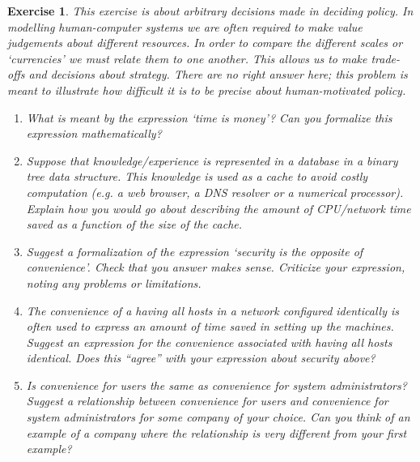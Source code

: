 \documentclass{book}
\newtheorem{exercise}{Exercise}
\begin{document}
\begin{exercise} 
This exercise is about arbitrary decisions made in deciding policy.
In modelling human-computer systems we are often required to make
value judgements about different resources. In order to compare the
different scales or `currencies' we must relate them to one another. This allows
us to make trade-offs and decisions about strategy. There are no right
answer here; this problem is meant to illustrate how difficult it is
to be precise about human-motivated policy.
\begin{enumerate}

\item What is meant by the expression `time is money'? Can you formalize this expression mathematically?
\item Suppose that knowledge/experience is represented in a database in  a binary tree data structure. This
knowledge is used as a cache to avoid costly computation (e.g. a web browser, a DNS resolver or a numerical
processor). Explain how you would go about describing the amount of CPU/network time saved as a function
of the size of the cache.
\item Suggest a formalization of the expression `security is the opposite of convenience'. Check that
you answer makes sense. Criticize your expression, noting any problems or limitations.
\item The convenience of a having all hosts in a network configured identically is often used to express
an amount of time saved in setting up the machines. Suggest an expression for the convenience associated
with having all hosts identical. Does this ``agree'' with your expression about security above?

\item Is convenience for users the same as convenience for system administrators? Suggest a relationship
between convenience for users and convenience for system administrators for some company of your choice.
Can you think of an example of a company where the relationship is very different from your
first example?
\end{enumerate}
\end{exercise}
\begin{solution}
\end{solution}
\end{document}
